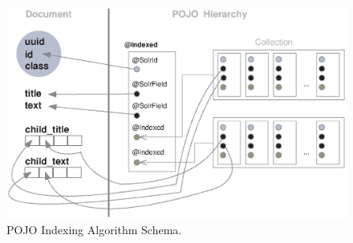 \begin{figure}[h]
	\centering
		\includegraphics[width=1.00\textwidth]{figures/indexAlgorithm.eps}
	\caption{POJO Indexing Algorithm Schema.}
	\label{fig:indexAlgorithm}
\end{figure}






